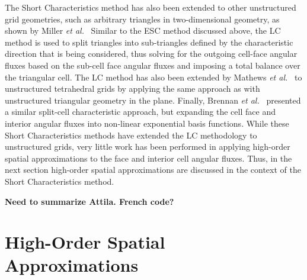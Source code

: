 The Short Characteristics method has also been extended to other unstructured grid geometries, such as arbitrary triangles in two-dimensional geometry, as shown by Miller \textit{et al.}~\cite{Miller1996} Similar to the ESC method discussed above, the LC method is used to split triangles into sub-triangles defined by the characteristic direction that is being considered, thus solving for the outgoing cell-face angular fluxes based on the sub-cell face angular fluxes and imposing a total balance over the triangular cell. The LC method has also been extended by Mathews \textit{et al.}~\cite{Mathews2000} to unstructured tetrahedral grids by applying the same approach as with unstructured triangular geometry in the plane. Finally, Brennan \textit{et al.}~\cite{Brennan2001} presented a similar split-cell characteristic approach, but expanding the cell face and interior angular fluxes into non-linear exponential basis functions. While these Short Characteristics methods have extended the LC methodology to unstructured grids, very little work has been performed in applying high-order spatial approximations to the face and interior cell angular fluxes. Thus, in the next section high-order spatial approximations are discussed in the context of the Short Characteristics method.

\textbf{Need to summarize Attila. French code?}

\section{High-Order Spatial Approximations}

